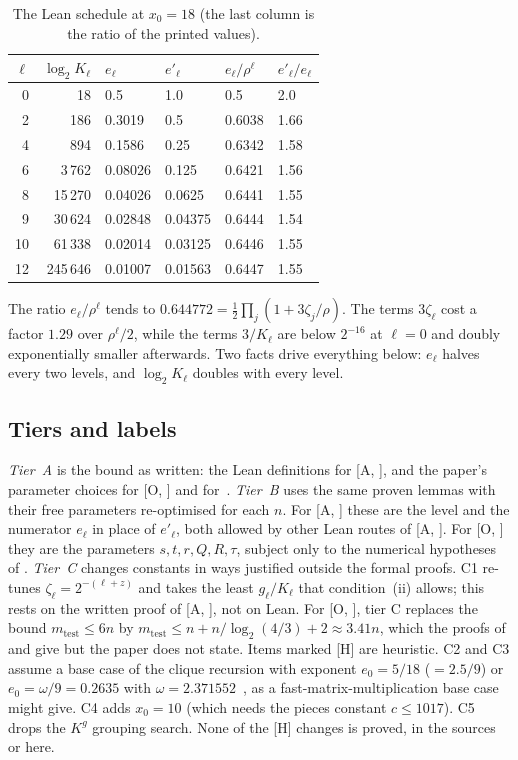 \documentclass[10pt]{amsart}
\theoremstyle{definition}
\theoremstyle{remark}
\numberwithin{equation}{section}
\newcommand{\A}[1][]{\textup{[A\if\relax\detokenize{#1}\relax\else, #1\fi]}}
\newcommand{\Oa}[1][]{\textup{[O\if\relax\detokenize{#1}\relax\else, #1\fi]}}
\newcommand{\Hh}{\textup{[H]}}
\begin{document}
\begin{table}[ht]
\centering\small
\caption{The Lean schedule at $x_0=18$ (the last column is the ratio of the printed values).}\label{tab:schedule}
\begin{tabular}{@{}rrllll@{}}
\toprule
$\ell$ & $\log_2K_\ell$ & $e_\ell$ & $e'_\ell$ & $e_\ell/\rho^\ell$ & $e'_\ell/e_\ell$\\
\midrule
0 & 18 & 0.5 & 1.0 & 0.5 & 2.0\\
2 & 186 & 0.3019 & 0.5 & 0.6038 & 1.66\\
4 & 894 & 0.1586 & 0.25 & 0.6342 & 1.58\\
6 & 3\,762 & 0.08026 & 0.125 & 0.6421 & 1.56\\
8 & 15\,270 & 0.04026 & 0.0625 & 0.6441 & 1.55\\
9 & 30\,624 & 0.02848 & 0.04375 & 0.6444 & 1.54\\
10 & 61\,338 & 0.02014 & 0.03125 & 0.6446 & 1.55\\
12 & 245\,646 & 0.01007 & 0.01563 & 0.6447 & 1.55\\
\bottomrule
\end{tabular}
\end{table}

The ratio $e_\ell/\rho^\ell$ tends to $0.644772=\frac12\prod_j(1+3\zeta_j/\rho)$. The terms
$3\zeta_\ell$ cost a factor $1.29$ over $\rho^\ell/2$, while the terms $3/K_\ell$ are below
$2^{-16}$ at $\ell=0$ and doubly exponentially smaller afterwards. Two facts drive everything
below: $e_\ell$ halves every two levels, and $\log_2K_\ell$ doubles with every level.

\subsection{Tiers and labels}\label{sec:tiers}
\emph{Tier~A} is the bound as written: the Lean definitions for \A, and the paper's parameter
choices for \Oa{} and for~\cite{Tulsyan26}. \emph{Tier~B} uses the same proven lemmas with their free
parameters re-optimised for each $n$. For \A{} these are the level and the numerator $e_\ell$ in
place of $e'_\ell$, both allowed by other Lean routes of \A. For \Oa{} they are the parameters
$s,t,r,Q,R,\tau$, subject only to the numerical hypotheses of . \emph{Tier~C} changes
constants in ways justified outside the formal proofs. C1 re-tunes $\zeta_\ell=2^{-(\ell+z)}$ and
takes the least $g_\ell/K_\ell$ that condition~(ii) allows; this rests on the written proof of \A,
not on Lean. For \Oa, tier C replaces the bound $m_{\mathrm{test}}\le6n$ by
$m_{\mathrm{test}}\le n+n/\log_2(4/3)+2\approx3.41n$, which the proofs of 
and  give but the paper does not state. Items marked \Hh{} are heuristic. C2
and C3 assume a base case of the clique recursion with exponent $e_0=5/18$ ($=2.5/9$) or
$e_0=\omega/9=0.2635$ with $\omega=2.371552$~\cite{VXXZ24}, as a fast-matrix-multiplication base
case might give. C4 adds $x_0=10$ (which needs the pieces constant $c\le1017$). C5 drops the $K^g$
grouping search. None of the \Hh{} changes is proved, in the sources or here.
\end{document}

